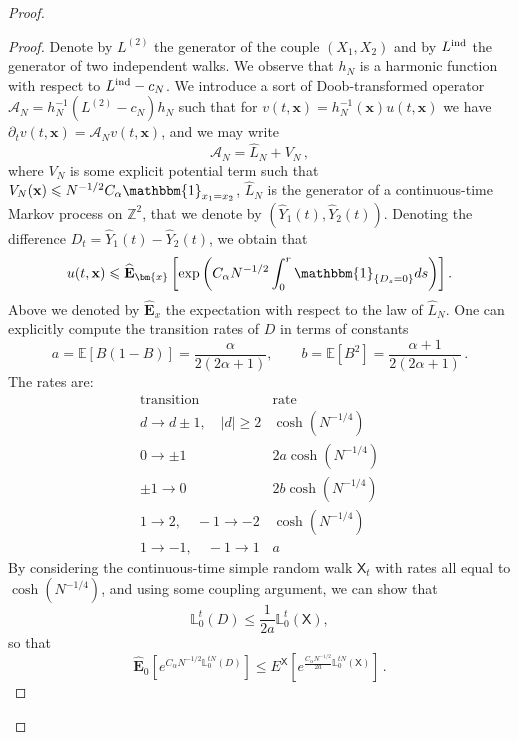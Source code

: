 \documentclass[a4paper,11pt,oneside,reqno]{amsart}
\theoremstyle{definition}
\renewcommand{\leq}{\leqslant}
\numberwithin{equation}{section}
\begin{document}
\begin{proof}
\begin{proof}
{					Denote by $L^{(2)}$ the generator of the couple $(X_1,X_2)$ and by $L^{\rm ind}$ the generator of two independent walks. We observe that $h_N$ is a harmonic function with respect to  $L^{\rm ind}-c_N$. We introduce a sort of Doob-transformed operator $\mathcal A_N = h_N^{-1} (L^{(2)}-c_N) h_N$ such that for $v(t,\mathbf x) = h_N^{-1}(\mathbf x) u(t,\mathbf x)$ we have   $\partial_t v(t,\mathbf x) = \mathcal A_N v(t,\mathbf x)$, and we may write 
					$$ \mathcal A_N = \widehat{L}_N + V_N\,, $$
					where $V_N$ is some explicit potential term such that $V_N(\mathbf x) \leq N^{-1/2} C_{\alpha} \mathbbm{1}_{x_1=x_2}$, $\widehat{L}_N$ is the generator of a continuous-time Markov process on $\mathbb Z^2$, that we denote by $(\widehat Y_1(t), \widehat Y_2(t))$. 
					Denoting the difference $D_t= \widehat Y_1(t)- \widehat Y_2(t)$, we obtain that 
					$$ u(t, \mathbf x) \leq \widehat{\mathbf{E}}_{\bm{x}}\left[\exp{\left(C_{\alpha}N^{-1/2}\int_{0}^{r}\mathbbm{1}_{\{D_{s}=0\}}ds\right)}\right].$$ Above we denoted by $\widehat{\mathbf{E}}_{x}$ the expectation with respect to the law of $\hat{L}_{N}$. 
					One can explicitly compute the transition rates of $D$ in terms of constants 
					\begin{equation*}
						a= \mathbb{E}[B(1-B)]=\frac{\alpha}{2(2\alpha+1)},\qquad b= \mathbb{E}[B^{2}]=\frac{\alpha+1}{2(2\alpha+1)}\,.
					\end{equation*}
					The rates are:
					\begin{equation*}
						\begin{array}{c|c}
							\text{transition}&\text{rate}\\ \hline
							d\to d\pm1,\quad |d|\ge2&\cosh(N^{-1/4})\\
							0\to\pm1&2a\cosh(N^{-1/4})\\
							\pm1\to0&2b\cosh(N^{-1/4})\\
							1\to2,\quad -1\to-2&\cosh(N^{-1/4})\\
							1\to-1,\quad -1\to1&a
						\end{array}
					\end{equation*}
					By considering the continuous-time simple random walk $\mathsf X_t$ with rates all equal to $\cosh(N^{-1/4})$, and using some coupling argument, we can show that 
					$$\mathbb{L}_{0}^{t}(D) \leq \frac{1}{2a}\mathbb{L}_{0}^{t}(\mathsf{X}),$$
					so that 
					\begin{equation}\label{local-time_D-X}
						\widehat{\mathbf{E}}_{0}\left[e^{C_{\alpha}N^{-1/2}\mathbb{L}_{0}^{tN}(D)}\right]
						\leq E^{\mathsf{X}}\left[e^{\frac{C_{\alpha}N^{-1/2}}{2a}\mathbb{L}_{0}^{tN}(\mathsf{X})}\right]\,.
					\end{equation}
					
}
\end{proof}
\end{proof}
\end{document}
